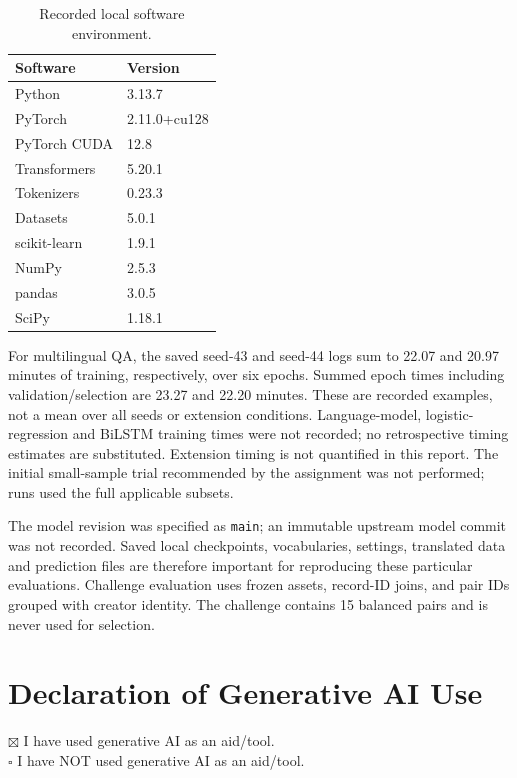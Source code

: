 \documentclass[11pt]{article}
\begin{document}
\begin{table}[ht]
\centering\small
\begin{tabular}{ll}
\toprule
Software & Version\\
\midrule
Python & 3.13.7\\
PyTorch & 2.11.0+cu128\\
PyTorch CUDA & 12.8\\
Transformers & 5.20.1\\
Tokenizers & 0.23.3\\
Datasets & 5.0.1\\
scikit-learn & 1.9.1\\
NumPy & 2.5.3\\
pandas & 3.0.5\\
SciPy & 1.18.1\\
\bottomrule
\end{tabular}
\caption{Recorded local software environment.}
\label{tab:environment}
\end{table}

For multilingual QA, the saved seed-43 and seed-44 logs sum to 22.07 and 20.97 minutes of training, respectively, over six epochs. Summed epoch times including validation/selection are 23.27 and 22.20 minutes. These are recorded examples, not a mean over all seeds or extension conditions. Language-model, logistic-regression and BiLSTM training times were not recorded; no retrospective timing estimates are substituted. Extension timing is not quantified in this report. The initial small-sample trial recommended by the assignment was not performed; runs used the full applicable subsets.

The model revision was specified as \texttt{main}; an immutable upstream model commit was not recorded. Saved local checkpoints, vocabularies, settings, translated data and prediction files are therefore important for reproducing these particular evaluations. Challenge evaluation uses frozen assets, record-ID joins, and pair IDs grouped with creator identity. The challenge contains 15 balanced pairs and is never used for selection.

\section{Declaration of Generative AI Use}
\noindent $\boxtimes$ I have used generative AI as an aid/tool.\\
$\square$ I have NOT used generative AI as an aid/tool.
\end{document}
